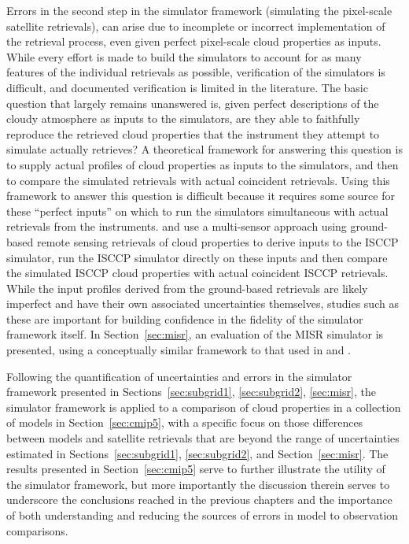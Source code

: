 Errors in the second step in the simulator framework (simulating the
pixel-scale satellite retrievals), can arise due to incomplete or
incorrect implementation of the retrieval process, even given perfect
pixel-scale cloud properties as inputs. While every effort is made to
build the simulators to account for as many features of the individual
retrievals as possible, verification of the simulators is difficult, and
documented verification is limited in the literature. The basic question
that largely remains unanswered is, given perfect descriptions of the
cloudy atmosphere as inputs to the simulators, are they able to
faithfully reproduce the retrieved cloud properties that the instrument
they attempt to simulate actually retrieves? A theoretical framework for
answering this question is to supply actual profiles of cloud properties
as inputs to the simulators, and then to compare the simulated
retrievals with actual coincident retrievals. Using this framework to
answer this question is difficult because it requires some source for
these ``perfect inputs'' on which to run the simulators simultaneous
with actual retrievals from the instruments. \citet{mace_et_al_2009} and
\citet{mace_et_al_2011} use a multi-sensor approach using ground-based
remote sensing retrievals of cloud properties to derive inputs to the
ISCCP simulator, run the ISCCP simulator directly on these inputs and
then compare the simulated ISCCP cloud properties with actual coincident
ISCCP retrievals. While the input profiles derived from the ground-based
retrievals are likely imperfect and have their own associated
uncertainties themselves, studies such as these are important for
building confidence in the fidelity of the simulator framework itself.
In Section~\ref{sec:misr}, an evaluation of the MISR simulator is
presented, using a conceptually similar framework to that used in
\citet{mace_et_al_2009} and \citet{mace_et_al_2011}.

Following the quantification of uncertainties and errors in the
simulator framework presented in
Sections~\ref{sec:subgrid1}, \ref{sec:subgrid2}, \ref{sec:misr}, the
simulator framework is applied to a comparison of cloud properties in a
collection of models in Section~\ref{sec:cmip5}, with a specific focus
on those differences between models and satellite retrievals that are
beyond the range of uncertainties estimated in
Sections~\ref{sec:subgrid1}, \ref{sec:subgrid2}, and
Section~\ref{sec:misr}. The results presented in Section~\ref{sec:cmip5}
serve to further illustrate the utility of the simulator framework, but
more importantly the discussion therein serves to underscore the
conclusions reached in the previous chapters and the importance of both
understanding and reducing the sources of errors in model to observation
comparisons.
